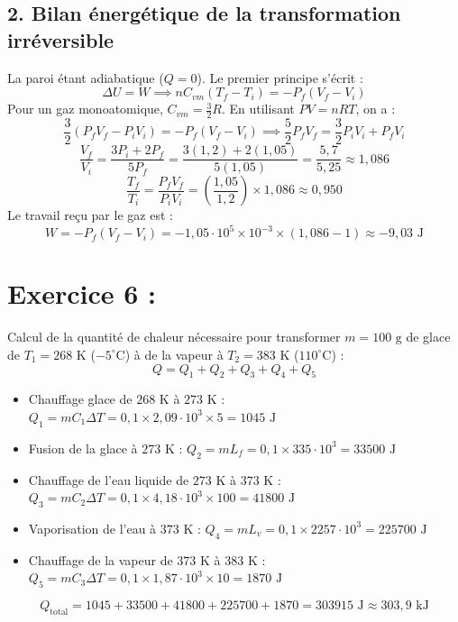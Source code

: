 \documentclass[a4paper,12pt]{article}
\begin{document}
 	\subsection*{2. Bilan énergétique de la transformation irréversible}
 	La paroi étant adiabatique ($Q = 0$). Le premier principe s'écrit :
 	\[ \Delta U = W \implies n C_{vm}(T_f - T_i) = -P_f(V_f - V_i) \]
 	Pour un gaz monoatomique, $C_{vm} = \frac{3}{2}R$. En utilisant $PV = nRT$, on a :
 	\[ \frac{3}{2}(P_f V_f - P_i V_i) = -P_f(V_f - V_i) \implies \frac{5}{2}P_f V_f = \frac{3}{2}P_i V_i + P_f V_i \]
 	\[ \frac{V_f}{V_i} = \frac{3 P_i + 2 P_f}{5 P_f} = \frac{3(1,2) + 2(1,05)}{5(1,05)} = \frac{5,7}{5,25} \approx 1,086 \]
 	\[ \frac{T_f}{T_i} = \frac{P_f V_f}{P_i V_i} = \left(\frac{1,05}{1,2}\right) \times 1,086 \approx 0,950 \]
 	Le travail reçu par le gaz est :
 	\[ W = -P_f(V_f - V_i) = -1,05\cdot 10^5 \times 10^{-3} \times (1,086 - 1) \approx -9,03\text{ J} \]
 	
 	\newpage
 	
 	\section*{Exercice 6 : }
 	Calcul de la quantité de chaleur nécessaire pour transformer $m = 100\text{ g}$ de glace de $T_1 = 268\text{ K}$ ($-5^\circ\text{C}$) à de la vapeur à $T_2 = 383\text{ K}$ ($110^\circ\text{C}$) :
 	\[ Q = Q_1 + Q_2 + Q_3 + Q_4 + Q_5 \]
 	\begin{itemize}
 		\item Chauffage glace de $268\text{ K}$ à $273\text{ K}$ : $Q_1 = m C_1 \Delta T = 0,1 \times 2,09\cdot 10^3 \times 5 = 1045\text{ J}$
 		\item Fusion de la glace à $273\text{ K}$ : $Q_2 = m L_f = 0,1 \times 335\cdot 10^3 = 33500\text{ J}$
 		\item Chauffage de l'eau liquide de $273\text{ K}$ à $373\text{ K}$ : $Q_3 = m C_2 \Delta T = 0,1 \times 4,18\cdot 10^3 \times 100 = 41800\text{ J}$
 		\item Vaporisation de l'eau à $373\text{ K}$ : $Q_4 = m L_v = 0,1 \times 2257\cdot 10^3 = 225700\text{ J}$
 		\item Chauffage de la vapeur de $373\text{ K}$ à $383\text{ K}$ : $Q_5 = m C_3 \Delta T = 0,1 \times 1,87\cdot 10^3 \times 10 = 1870\text{ J}$
 	\end{itemize}
 	\[ Q_{\text{total}} = 1045 + 33500 + 41800 + 225700 + 1870 = 303915\text{ J} \approx 303,9\text{ kJ} \]
 	
\end{document}
